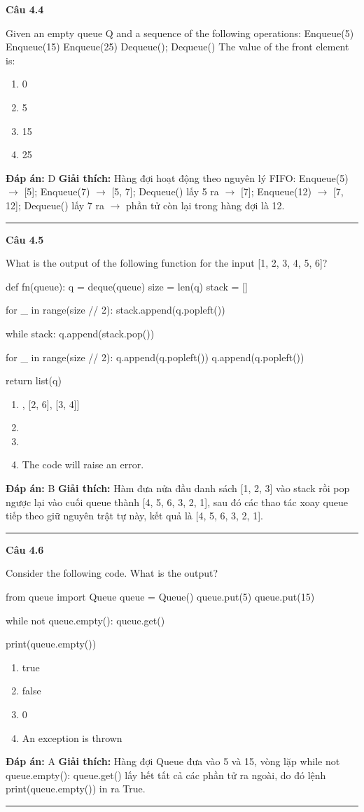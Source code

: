 \documentclass[11pt,a4paper]{article}
\newenvironment{question}[1]{%
  \par\vspace{1em}\noindent\textbf{\large Câu #1}\par\vspace{0.4em}
}{%
  \par\vspace{1em}\hrule\vspace{0.6em}
}
\newenvironment{choices}{%
  \begin{enumerate}[label=\textbf{\Alph*.},leftmargin=2.2em,itemsep=2pt,topsep=3pt]
}{%
  \end{enumerate}
}
\newcommand{\choice}{\item}
\newenvironment{codebox}{%
  \begin{tcolorbox}[colback=gray!8!white,colframe=gray!50!black,arc=1.5mm,boxrule=0.6pt,left=3mm,right=3mm,top=2.5mm,bottom=2.5mm]
  \ttfamily\small
}{%
  \end{tcolorbox}
}
\begin{document}
\begin{question}{4.4}
Given an empty queue Q and a sequence of the following operations: Enqueue(5) Enqueue(15) Enqueue(25) Dequeue(); Dequeue() The value of the front element is:
\begin{choices}
\choice 0
\choice 5
\choice 15
\choice 25
\end{choices}
\textbf{Đáp án:} D
\textbf{Giải thích:} Hàng đợi hoạt động theo nguyên lý FIFO: Enqueue(5) \(\to\) [5]; Enqueue(7) \(\to\) [5, 7]; Dequeue() lấy 5 ra \(\to\) [7]; Enqueue(12) \(\to\) [7, 12]; Dequeue() lấy 7 ra \(\to\) phần tử còn lại trong hàng đợi là 12.
\end{question}

\begin{question}{4.5}
What is the output of the following function for the input [1, 2, 3, 4, 5, 6]?
\begin{codebox}
def fn(queue):
    q = deque(queue)
    size = len(q)
    stack = []

    for _ in range(size // 2):
        stack.append(q.popleft())

    while stack:
        q.append(stack.pop())

    for _ in range(size // 2):
        q.append(q.popleft())
        q.append(q.popleft())

    return list(q)
\end{codebox}
\begin{choices}
\choice [[1, 5], [2, 6], [3, 4]]
\choice [4, 5, 6, 3, 2, 1]
\choice [1, 3, 5, 2, 4, 6]
\choice The code will raise an error.
\end{choices}
\textbf{Đáp án:} B
\textbf{Giải thích:} Hàm đưa nửa đầu danh sách [1, 2, 3] vào stack rồi pop ngược lại vào cuối queue thành [4, 5, 6, 3, 2, 1], sau đó các thao tác xoay queue tiếp theo giữ nguyên trật tự này, kết quả là [4, 5, 6, 3, 2, 1].
\end{question}

\begin{question}{4.6}
Consider the following code. What is the output?
\begin{codebox}
from queue import Queue
queue = Queue()
queue.put(5)
queue.put(15)

while not queue.empty():
    queue.get()

print(queue.empty())
\end{codebox}
\begin{choices}
\choice true
\choice false
\choice 0
\choice An exception is thrown
\end{choices}
\textbf{Đáp án:} A
\textbf{Giải thích:} Hàng đợi Queue đưa vào 5 và 15, vòng lặp while not queue.empty(): queue.get() lấy hết tất cả các phần tử ra ngoài, do đó lệnh print(queue.empty()) in ra True.
\end{question}
\end{document}

